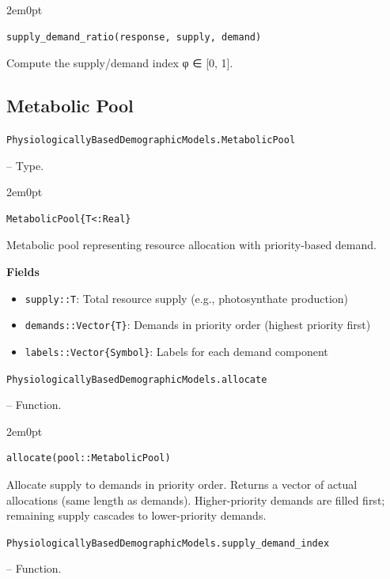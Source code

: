 \begin{adjustwidth}{2em}{0pt}


\begin{verbatim}
supply_demand_ratio(response, supply, demand)
\end{verbatim}

Compute the supply/demand index φ ∈ [0, 1].



\end{adjustwidth}

\subsection{Metabolic Pool}



\label{9250430198331663556}{}

\hypertarget{17964707265540119272}{\texttt{PhysiologicallyBasedDemographicModels.MetabolicPool}}  -- {Type.}

\begin{adjustwidth}{2em}{0pt}


\begin{verbatim}
MetabolicPool{T<:Real}
\end{verbatim}

Metabolic pool representing resource allocation with priority-based demand.

\textbf{Fields}

\begin{itemize}
\item \texttt{supply::T}: Total resource supply (e.g., photosynthate production)


\item \texttt{demands::Vector\{T\}}: Demands in priority order (highest priority first)


\item \texttt{labels::Vector\{Symbol\}}: Labels for each demand component

\end{itemize}


\end{adjustwidth}
\hypertarget{18163779516537638150}{\texttt{PhysiologicallyBasedDemographicModels.allocate}}  -- {Function.}

\begin{adjustwidth}{2em}{0pt}


\begin{verbatim}
allocate(pool::MetabolicPool)
\end{verbatim}

Allocate supply to demands in priority order. Returns a vector of actual allocations (same length as demands). Higher-priority demands are filled first; remaining supply cascades to lower-priority demands.



\end{adjustwidth}
\hypertarget{12468922084678600260}{\texttt{PhysiologicallyBasedDemographicModels.supply\_demand\_index}}  -- {Function.}

